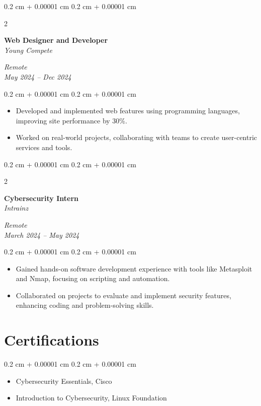 \documentclass[10pt, letterpaper]{article}
\newenvironment{highlights}{
    \begin{itemize}[
        topsep=0.10 cm,
        parsep=0.10 cm,
        partopsep=0pt,
        itemsep=0pt,
        leftmargin=0.4 cm + 10pt
    ]
}{
    \end{itemize}
} %
\newenvironment{onecolentry}{
    \begin{adjustwidth}{
        0.2 cm + 0.00001 cm
    }{
        0.2 cm + 0.00001 cm
    }
}{
    \end{adjustwidth}
} %
\newenvironment{twocolentry}[2][]{
    \onecolentry
    \def\secondColumn{#2}
    \setcolumnwidth{\fill, 4.5 cm}
    \begin{paracol}{2}
}{
    \switchcolumn \raggedleft \secondColumn
    \end{paracol}
    \endonecolentry
} %
\begin{document}
    \vspace{0.2 cm}
    \begin{twocolentry}{
        \textit{Remote} \\
        \textit{May 2024 – Dec 2024}
    }
        \textbf{Web Designer and Developer} \\
        \textit{Young Compete}
    \end{twocolentry}
    \vspace{0.10 cm}
    \begin{onecolentry}
        \begin{highlights}
            \item Developed and implemented web features using programming languages, improving site performance by 30\%.
            \item Worked on real-world projects, collaborating with teams to create user-centric services and tools.
        \end{highlights}
    \end{onecolentry}

    \vspace{0.2 cm}
    \begin{twocolentry}{
        \textit{Remote} \\
        \textit{March 2024 – May 2024}
    }
        \textbf{Cybersecurity Intern} \\
        \textit{Intrainz}
    \end{twocolentry}
    \vspace{0.10 cm}
    \begin{onecolentry}
        \begin{highlights}
            \item Gained hands-on software development experience with tools like Metasploit and Nmap, focusing on scripting and automation.
            \item Collaborated on projects to evaluate and implement security features, enhancing coding and problem-solving skills.
        \end{highlights}
    \end{onecolentry}

    \section{Certifications}
    \begin{onecolentry}
        \begin{highlights}
            \item Cybersecurity Essentials, Cisco
            \item Introduction to Cybersecurity, Linux Foundation
        \end{highlights}
    \end{onecolentry}
\end{document}
